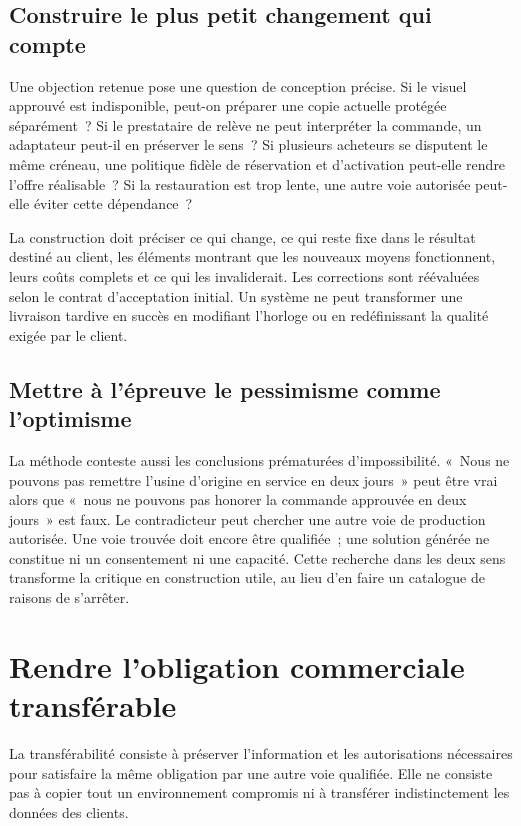 \documentclass[11pt,a4paper]{article}
\begin{document}
\subsection{Construire le plus petit changement qui compte}
Une objection retenue pose une question de conception précise. Si le visuel approuvé est indisponible, peut-on préparer une copie actuelle protégée séparément~? Si le prestataire de relève ne peut interpréter la commande, un adaptateur peut-il en préserver le sens~? Si plusieurs acheteurs se disputent le même créneau, une politique fidèle de réservation et d’activation peut-elle rendre l’offre réalisable~? Si la restauration est trop lente, une autre voie autorisée peut-elle éviter cette dépendance~?

La construction doit préciser ce qui change, ce qui reste fixe dans le résultat destiné au client, les éléments montrant que les nouveaux moyens fonctionnent, leurs coûts complets et ce qui les invaliderait. Les corrections sont réévaluées selon le contrat d’acceptation initial. Un système ne peut transformer une livraison tardive en succès en modifiant l’horloge ou en redéfinissant la qualité exigée par le client.

\subsection{Mettre à l’épreuve le pessimisme comme l’optimisme}
La méthode conteste aussi les conclusions prématurées d’impossibilité. «~Nous ne pouvons pas remettre l’usine d’origine en service en deux jours~» peut être vrai alors que «~nous ne pouvons pas honorer la commande approuvée en deux jours~» est faux. Le contradicteur peut chercher une autre voie de production autorisée. Une voie trouvée doit encore être qualifiée~; une solution générée ne constitue ni un consentement ni une capacité. Cette recherche dans les deux sens transforme la critique en construction utile, au lieu d’en faire un catalogue de raisons de s’arrêter.

\section{Rendre l’obligation commerciale transférable}\label{sec:portable}
La transférabilité consiste à préserver l’information et les autorisations nécessaires pour satisfaire la même obligation par une autre voie qualifiée. Elle ne consiste pas à copier tout un environnement compromis ni à transférer indistinctement les données des clients.
\end{document}
